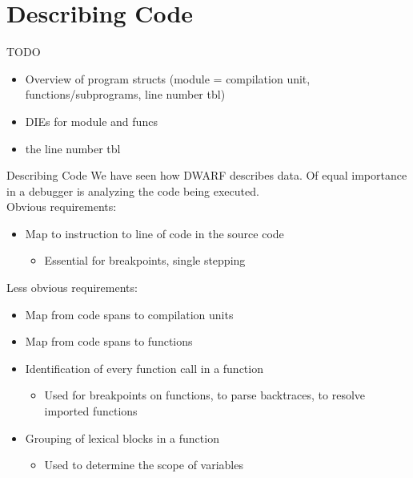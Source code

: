 
\section{Describing Code}


\begin{frame}{TODO}
\begin{itemize}
\item Overview of program structs (module = compilation unit, functions/subprograms, line number tbl)
\item DIEs for module and funcs
\item the line number tbl 
\end{itemize}
\end{frame}


\begin{frame}{Describing Code}
We have seen how DWARF describes \alert{data}.
Of equal importance in a debugger is analyzing the \alert{code being executed}.\\
\medskip
Obvious requirements:\\
\begin{itemize}
\item Map to instruction to line of code in the source code
	\begin{itemize}
	\item Essential for breakpoints, single stepping
	\end{itemize}
\end{itemize}
\medskip
Less obvious requirements:
\begin{itemize}
\item Map from code spans to compilation units
\item Map from code spans to functions
\item Identification of every function call in a function
	\begin{itemize}
	\item Used for breakpoints on functions, to parse backtraces, to resolve imported functions
	\end{itemize}
\item Grouping of lexical blocks in a function
	\begin{itemize}
	\item Used to determine the scope of variables
	\end{itemize}
\end{itemize}
\end{frame}


